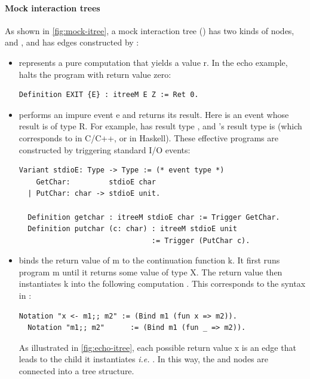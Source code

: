 \paragraph{Mock interaction trees}
As shown in \autoref{fig:mock-itree}, a mock interaction tree () has
two kinds of nodes,  and , and has edges constructed by
:
\begin{itemize}
\item {} represents a pure computation that yields a value \ilc r.
  In the echo example,  halts the program with return value zero:
\begin{lstlisting}[style=customcoq]
  Definition EXIT {E} : itreeM E Z := Ret 0.
\end{lstlisting}
\item {} performs an impure event \ilc e and returns its result.
  Here  is an event whose result is of type \ilc R.  For example,
   has result type , and 's result type is
   (which corresponds to  in C/C++, or \ilc{()} in
  Haskell).  These effective programs are constructed by triggering standard I/O
  events:
\begin{lstlisting}[style=customcoq]
  Variant stdioE: Type -> Type := (* event type *)
    GetChar:         stdioE char
  | PutChar: char -> stdioE unit.
  
  Definition getchar : itreeM stdioE char := Trigger GetChar.
  Definition putchar (c: char) : itreeM stdioE unit
                               := Trigger (PutChar c).
\end{lstlisting}
\item {} binds the return value of \ilc m to the continuation
  function \ilc k.  It first runs program \ilc m until it returns some value of
  type \ilc X.  The return value  then instantiates \ilc k into the
  following computation .  This corresponds to the
  \ilc{(;;)} syntax in :
\begin{lstlisting}[style=customcoq]
  Notation "x <- m1;; m2" := (Bind m1 (fun x => m2)).
  Notation "m1;; m2"      := (Bind m1 (fun _ => m2)).
\end{lstlisting}

As illustrated in \autoref{fig:echo-itree}, each possible return value \ilc x is
an edge that leads to the child it instantiates {\it i.e.} .  In this
way, the  and  nodes are connected into a tree
structure.
\end{itemize}

